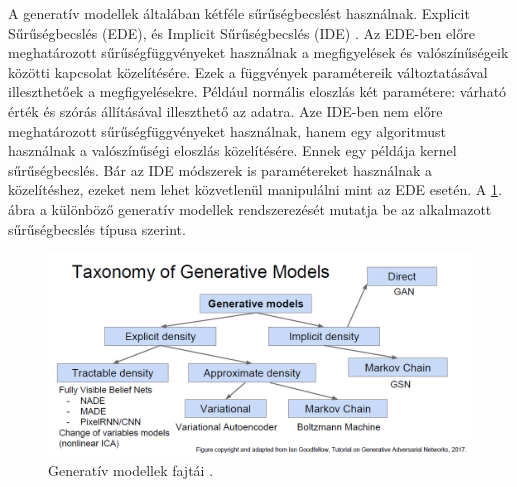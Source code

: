 A generatív modellek általában kétféle sűrűségbecslést használnak. Explicit Sűrűségbecslés (EDE), és Implicit Sűrűségbecslés (IDE) \cite{goodfellow2016nips}. Az EDE-ben előre meghatározott sűrűségfüggvényeket használnak a megfigyelések és valószínűségeik közötti kapcsolat közelítésére. Ezek a függvények paramétereik változtatásával illeszthetőek a megfigyelésekre. Például normális eloszlás két paramétere: várható érték és szórás állításával illeszthető az adatra. Aze IDE-ben nem előre meghatározott sűrűségfüggvényeket használnak, hanem egy algoritmust használnak a valószínűségi eloszlás közelítésére. Ennek egy példája kernel sűrűségbecslés. Bár az IDE módszerek is paramétereket használnak a közelítéshez, ezeket nem lehet közvetlenül manipulálni mint az EDE esetén. A \ref{fig:gen_models_tax}. ábra a különböző generatív modellek rendszerezését mutatja be az alkalmazott sűrűségbecslés típusa szerint.



\begin{figure}[ht]
	\centering
	\includegraphics[width=1\columnwidth]{figures/generative_model_taxonomy.png}
	\caption{Generatív modellek fajtái \cite{goodfellow2016nips}.}
	\label{fig:gen_models_tax}
\end{figure}


